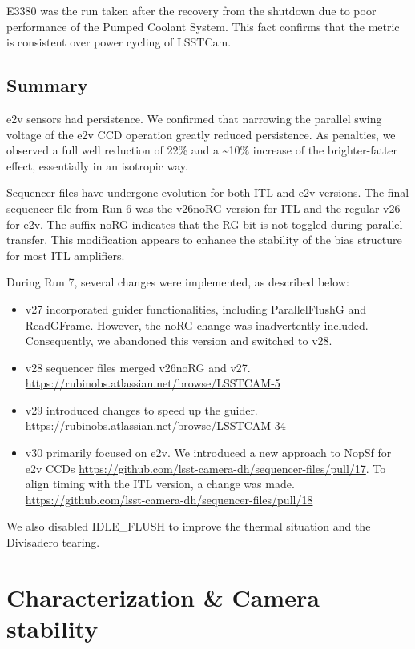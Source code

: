 E3380 was the run taken after the recovery from the shutdown due to poor performance of the Pumped Coolant System. This fact confirms that the metric is consistent over power cycling of LSSTCam.

\subsection{Summary}\label{summary:optimization}

e2v sensors had persistence. We confirmed that narrowing the parallel swing voltage of the e2v CCD operation greatly reduced persistence. As penalties, we observed a full well reduction of 22\% and a \textasciitilde10\% increase of the
brighter-fatter effect, essentially in an isotropic way.

Sequencer files have undergone evolution for both ITL and e2v versions.
The final sequencer file from Run 6 was the
v26noRG version for ITL and the regular v26
for e2v. The suffix noRG indicates that the
RG bit is not toggled during parallel transfer. This modification
appears to enhance the stability of the bias structure for most ITL
amplifiers.

During Run 7, several changes were implemented, as described below:

\begin{itemize}
\tightlist
\item
  v27 incorporated guider functionalities, including ParallelFlushG and
  ReadGFrame. However, the noRG change was inadvertently included.
  Consequently, we abandoned this version and switched to v28.
\item
  v28 sequencer files merged v26noRG and
  v27. \url{https://rubinobs.atlassian.net/browse/LSSTCAM-5}
\item
  v29 introduced changes to speed up the guider.
  \url{https://rubinobs.atlassian.net/browse/LSSTCAM-34}
\item
  v30 primarily focused on e2v. We introduced a new approach to NopSf
  for e2v CCDs
  \url{https://github.com/lsst-camera-dh/sequencer-files/pull/17}. To
  align timing with the ITL version, a change was made.
  \url{https://github.com/lsst-camera-dh/sequencer-files/pull/18}
\end{itemize}

We also disabled IDLE\_FLUSH to improve the thermal situation and the Divisadero tearing.




\section{Characterization \& Camera
stability}\label{characterization-camera-stability}



